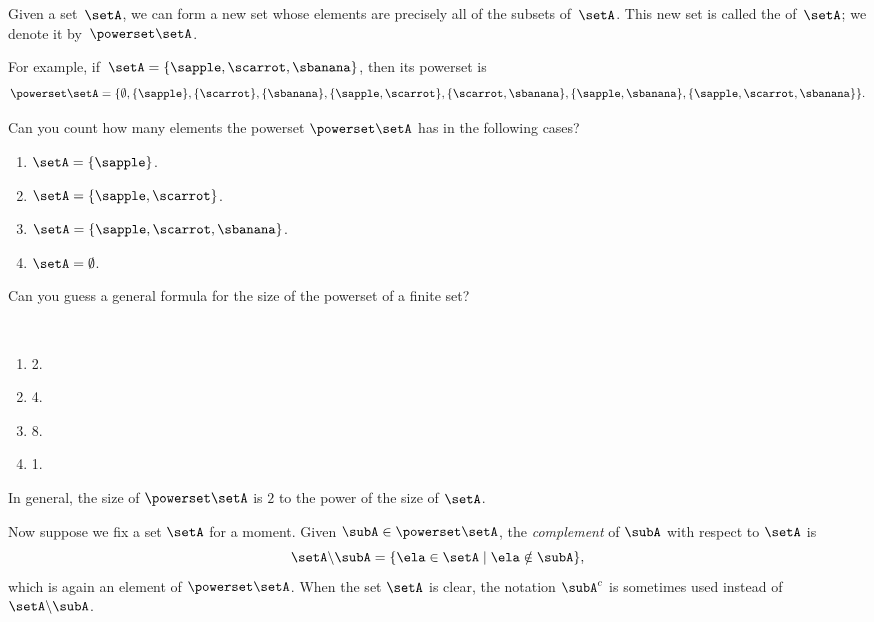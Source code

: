 Given a set~$\setA$, we can form a new set whose elements are precisely all of the subsets of~$\setA$.
This new set is called the  of~$\setA$; we denote it by~$\powerset \setA$.

For example, if~$\setA = \{ \sapple, \scarrot, \sbanana \}$, then its powerset is
\begin{equation*}
    \powerset \setA = \{ \emptyset, \{ \sapple \}, \{ \scarrot \}, \{ \sbanana\}, \{ \sapple, \scarrot \}, \{ \scarrot, \sbanana \}, \{ \sapple, \sbanana\}, \{ \sapple, \scarrot, \sbanana \} \}.
\end{equation*}

\begin{exercise}
    Can you count how many elements the powerset $\powerset \setA$ has in the following cases?
    \begin{enumerate}
        \item $\setA = \{ \sapple \} $.
        \item $\setA = \{ \sapple, \scarrot \} $.
        \item $\setA = \{ \sapple, \scarrot, \sbanana \} $.
        \item $\setA = \emptyset $.
    \end{enumerate}
    Can you guess a general formula for the size of the powerset of a finite set?
\end{exercise}

\begin{solution}
    \

    \begin{enumerate}
        \item 2.
        \item 4.
        \item 8.
        \item 1.
    \end{enumerate}
    In general, the size of $\powerset \setA$ is $2$ to the power of the size of $\setA$.
\end{solution}

Now suppose we fix a set $\setA$ for a moment.
Given $\subA \in \powerset \setA$, the \emph{complement} of $\subA$ with respect to $\setA$ is
\begin{equation}
    \setA \backslash \subA = \{ \ela \in \setA \mid \ela \notin \subA \},
\end{equation}
which is again an element of $\powerset \setA$.
When the set $\setA$ is clear, the notation $\subA^c$ is sometimes used instead of $\setA \backslash \subA$.

